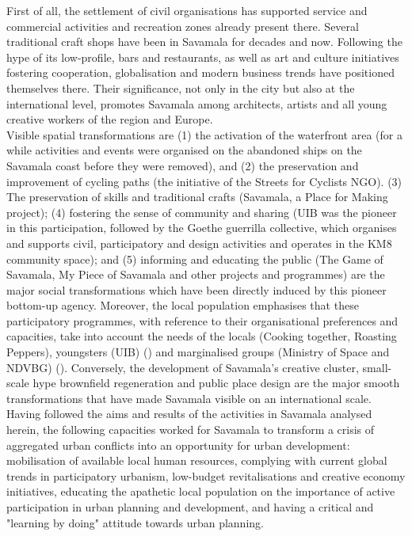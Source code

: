 \documentclass[11pt]{report}
\begin{document}
{{{First of all, the settlement of civil organisations has supported service and commercial activities and recreation zones already present there. Several traditional craft shops have been in Savamala for decades and now. Following the hype of its low-profile, bars and restaurants, as well as art and culture initiatives fostering cooperation, globalisation and modern business trends have positioned themselves there.
Their significance, not only in the city but also at the international level, promotes Savamala among architects, artists and all young creative workers of the region and Europe.
\\

Visible spatial transformations are (1) the activation of the waterfront area (for a while activities and events were organised on the abandoned ships on the Savamala coast before they were removed), and (2) the preservation and improvement of cycling paths (the initiative of the Streets for Cyclists NGO). (3) The preservation of skills and traditional crafts (Savamala, a Place for Making project); (4) fostering the sense of community and sharing (UIB was the pioneer in this participation, followed by the Goethe guerrilla collective, which organises and supports civil, participatory and design activities and operates in the KM8 community space); and (5) informing and educating the public (The Game of Savamala, My Piece of Savamala and other projects and programmes) are the major social transformations which have been directly induced by this pioneer bottom-up agency. Moreover, the local population emphasises that these participatory programmes, with reference to their organisational preferences and capacities, take into account the needs of the locals (Cooking together, Roasting Peppers), youngsters (UIB) (\href{Muller}{\citealt{muller-wieferig_urban_2013}})
and marginalised groups (Ministry of Space and NDVBG)
(\href{Mitic}{\citealt{mitic_ekskluzivno:_2016}}).
Conversely, the development of Savamala’s creative cluster, small-scale hype brownfield regeneration and public place design are the major smooth transformations that have made Savamala visible on an international scale.
\\

Having followed the aims and results of the activities in Savamala analysed herein, the following capacities worked for Savamala to transform a crisis of aggregated urban conflicts into an opportunity for urban development:
mobilisation of available local human resources,
complying with current global trends in participatory urbanism, low-budget revitalisations and creative economy initiatives, educating the apathetic local population on the importance of active participation in urban planning and development,
and
having a critical and "learning by doing" attitude  towards urban planning.
\\

}}}
\end{document}
